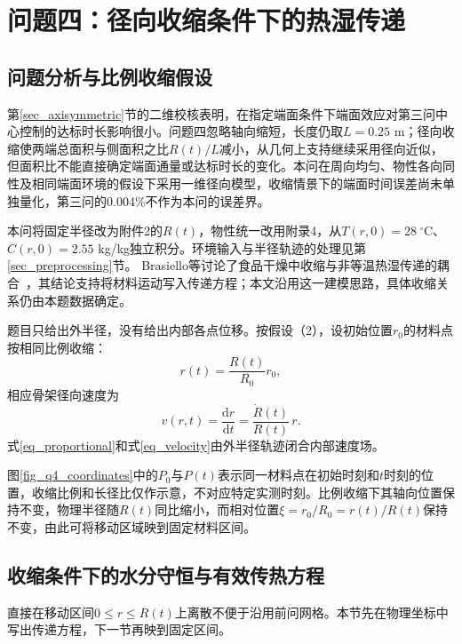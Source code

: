 \section{问题四：径向收缩条件下的热湿传递}\label{sec_q4}
\subsection{问题分析与比例收缩假设}
第\ref{sec_axisymmetric}节的二维校核表明，在指定端面条件下端面效应对第三问中心控制的达标时长影响很小。问题四忽略轴向缩短，长度仍取$L=0.25$ m；径向收缩使两端总面积与侧面积之比$R(t)/L$减小，从几何上支持继续采用径向近似，但面积比不能直接确定端面通量或达标时长的变化。本问在周向均匀、物性各向同性及相同端面环境的假设下采用一维径向模型，收缩情景下的端面时间误差尚未单独量化，第三问的0.004\%不作为本问的误差界。

本问将固定半径改为附件2的$R(t)$，物性统一改用附录4，从$T(r,0)=28\ ^\circ$C、$C(r,0)=2.55$ kg/kg独立积分。环境输入与半径轨迹的处理见第\ref{sec_preprocessing}节。
Brasiello等讨论了食品干燥中收缩与非等温热湿传递的耦合~\cite{brasiello2021}，其结论支持将材料运动写入传递方程；本文沿用这一建模思路，具体收缩关系仍由本题数据确定。

题目只给出外半径，没有给出内部各点位移。按假设（2），设初始位置$r_0$的材料点按相同比例收缩：
\begin{equation}\label{eq_proportional}
r(t)=\frac{R(t)}{R_0}r_0,
\end{equation}
相应骨架径向速度为
\begin{equation}\label{eq_velocity}
v(r,t)=\frac{\mathrm dr}{\mathrm dt}=\frac{\dot R(t)}{R(t)}\,r.
\end{equation}
式\eqref{eq_proportional}和式\eqref{eq_velocity}由外半径轨迹闭合内部速度场。

图\ref{fig_q4_coordinates}中的$P_0$与$P(t)$表示同一材料点在初始时刻和$t$时刻的位置，收缩比例和长径比仅作示意，不对应特定实测时刻。比例收缩下其轴向位置保持不变，物理半径随$R(t)$同比缩小，而相对位置$\xi=r_0/R_0=r(t)/R(t)$保持不变，由此可将移动区域映到固定材料区间。
\FloatBarrier

\subsection{收缩条件下的水分守恒与有效传热方程}
直接在移动区间$0\le r\le R(t)$上离散不便于沿用前问网格。本节先在物理坐标中写出传递方程，下一节再映到固定区间。

